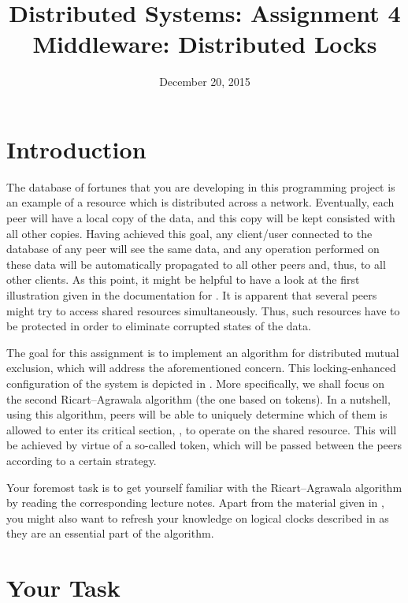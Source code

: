 \documentclass[a4paper]{article}
\title{Distributed Systems: Assignment 4\\Middleware: Distributed Locks}
\author{}
\date{December 20, 2015}
\begin{document}
\maketitle

\section{Introduction}

The database of fortunes that you are developing in this programming project is
an example of a resource which is distributed across a network. Eventually, each
peer will have a local copy of the data, and this copy will be kept consisted
with all other copies. Having achieved this goal, any client/user connected to
the database of any peer will see the same data, and any operation performed on
these data will be automatically propagated to all other peers and, thus, to all
other clients. As this point, it might be helpful to have a look at the first
illustration given in the documentation for . It is apparent that
several peers might try to access shared resources simultaneously. Thus, such
resources have to be protected in order to eliminate corrupted states of the
data.

The goal for this assignment is to implement an algorithm for distributed mutual
exclusion, which will address the aforementioned concern. This locking-enhanced
configuration of the system is depicted in . More specifically, we
shall focus on the second Ricart--Agrawala algorithm \cite{lecture67} (the one
based on tokens). In a nutshell, using this algorithm, peers will be able to
uniquely determine which of them is allowed to enter its critical section, \ie,
to operate on the shared resource. This will be achieved by virtue of a
so-called token, which will be passed between the peers according to a certain
strategy.

Your foremost task is to get yourself familiar with the Ricart--Agrawala
algorithm by reading the corresponding lecture notes. Apart from the material
given in \cite{lecture67}, you might also want to refresh your knowledge on
logical clocks described in \cite{lecture5} as they are an essential part of the
algorithm.

\section{Your Task}
\end{document}
